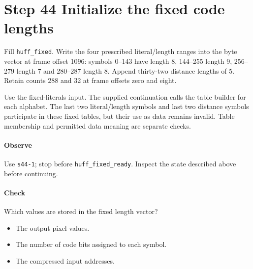 \section{Step 44 Initialize the fixed code lengths}\label{png-huff-s44}
Fill \texttt{huff\_fixed}. Write the four prescribed literal/length ranges into the byte vector at frame offset 1096: symbols 0--143 have length 8, 144--255 length 9, 256--279 length 7 and 280--287 length 8. Append thirty-two distance lengths of 5. Retain counts 288 and 32 at frame offsets zero and eight.

Use the fixed-literals input. The supplied continuation calls the table builder for each alphabet. The last two literal/length symbols and last two distance symbols participate in these fixed tables, but their use as data remains invalid. Table membership and permitted data meaning are separate checks.

\paragraph{Observe} Use \texttt{s44-1}; stop before \texttt{huff\_fixed\_ready}. Inspect the state described above before continuing.

\paragraph{Check} Which values are stored in the fixed length vector?
\begin{itemize}
  \item[A.] The output pixel values.
  \item[B.] The number of code bits assigned to each symbol.
  \item[C.] The compressed input addresses.
\end{itemize}
